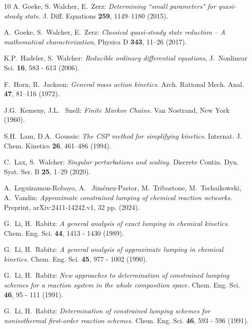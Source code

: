 \documentclass{article}
\begin{document}
\begin{thebibliography}{10}
  A. Goeke, S. Walcher, E.~Zerz: {\it Determining ``small parameters" 
for quasi-steady state.} J. Diff. Equations {\bf 259}, 1149--1180 (2015).

 A.~Goeke, S.~Walcher, E.~Zerz: {\it Classical quasi-steady 
state reduction -- A mathematical characterization}, Physica D {\bf 343}, 
11--26 (2017).

%
  K.P.~Hadeler, S.~Walcher: {\it Reducible ordinary differential 
equations}, J.~Nonlinear Sci. {\bf 16}, 583 - 613 (2006).

 F.~Horn, R.~Jackson: {\it General mass action 
kinetics.} Arch. Rational Mech. Anal. {\bf 47}, 81--116 (1972).

%
 J.G.~Kemeny, J.L.~ Snell: {\it Finite Markov Chains.}
Van Nostrand, New York (1960).

 S.H.~Lam, D.A.~Goussis: {\it The CSP method for 
simplifying kinetics.} Internat. J. Chem. Kinetics {\bf 26}, 461--486 (1994).

C.~Lax, S.~Walcher: {\it Singular perturbations and scaling.}
Discrete Contin. Dyn. Syst. Ser. B {\bf 25}, 1--29 (2020).

 A.~Leguizamon-Robayo, A.~ Jim\'enez-Pastor, M.~Tribastone,
M.~Tschaikowski, A.~Vandin: {\it Approximate constrained lumping of
chemical reaction networks.} Preprint, arXiv:2411-14242.v1, 32 pp. (2024).

 G.~Li, H.~Rabitz: {\it A general analysis of exact lumping in 
chemical kinetics.} Chem. Eng. Sci. {\bf 44}, 1413 - 1430 (1989).

  G.~Li, H.~Rabitz: {\it A general analysis of approximate 
lumping in chemical kinetics.} Chem. Eng. Sci. {\bf 45}, 977 - 1002 (1990).

   G.~Li, H.~Rabitz: {\it  New approaches to determination of 
constrained lumping schemes for a reaction system in the whole composition 
space.} Chem. Eng. Sci. {\bf 46}, 95 - 111 (1991).

   G.~Li, H.~Rabitz: {\it  Determination of constrained lumping 
schemes for nonisothermal first-order reaction schemes.} Chem. Eng. Sci. 
{\bf 46}, 593 - 596 (1991).


\end{thebibliography}
\end{document}
